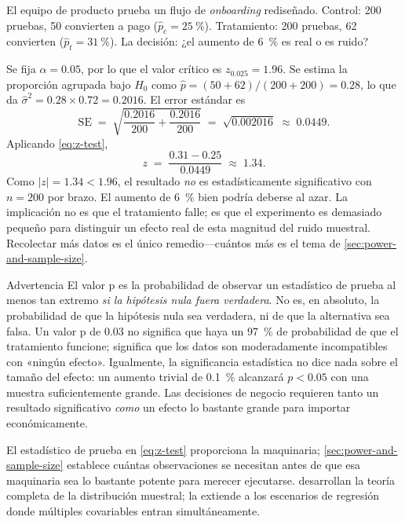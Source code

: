\begin{example}
El equipo de producto prueba un flujo de \emph{onboarding} rediseñado. Control: \num{200}
pruebas, \num{50} convierten a pago (\(\hat{p}_c = \qty{25}{\percent}\)). Tratamiento:
\num{200} pruebas, \num{62} convierten (\(\hat{p}_t = \qty{31}{\percent}\)). La decisión:
¿el aumento de \qty{6}{\percent} es real o es ruido?

Se fija \(\alpha=0.05\), por lo que el valor crítico es \(z_{0.025}=1.96\). Se estima la
proporción agrupada bajo \(H_0\) como \(\hat{p} = (50+62)/(200+200) = 0.28\), lo que da
\(\hat{\sigma}^2 = 0.28 \times 0.72 = 0.2016\). El error estándar es
\[
  \mathrm{SE} \;=\; \sqrt{\frac{0.2016}{200}+\frac{0.2016}{200}}
               \;=\; \sqrt{0.002016}
               \;\approx\; 0.0449.
\]
Aplicando \cref{eq:z-test},
\[
  z \;=\; \frac{0.31 - 0.25}{0.0449} \;\approx\; 1.34.
\]
Como \(|z|=1.34 < 1.96\), el resultado \emph{no} es estadísticamente significativo con
\(n=200\) por brazo. El aumento de \qty{6}{\percent} bien podría deberse al azar. La
implicación no es que el tratamiento falle; es que el experimento es demasiado pequeño para
distinguir un efecto real de esta magnitud del ruido muestral. Recolectar más datos es el
único remedio---cuántos más es el tema de \cref{sec:power-and-sample-size}.
\end{example}

\begin{admonition}{Advertencia}
El valor p es la probabilidad de observar un estadístico de prueba al menos tan extremo
\emph{si la hipótesis nula fuera verdadera}. No es, en absoluto, la probabilidad de que la
hipótesis nula sea verdadera, ni de que la alternativa sea falsa. Un valor p de \num{0.03}
no significa que haya un \qty{97}{\percent} de probabilidad de que el tratamiento funcione;
significa que los datos son moderadamente incompatibles con «ningún efecto». Igualmente, la
significancia estadística no dice nada sobre el tamaño del efecto: un aumento trivial de
\qty{0.1}{\percent} alcanzará \(p<0.05\) con una muestra suficientemente grande. Las
decisiones de negocio requieren tanto un resultado significativo \emph{como} un efecto lo
bastante grande para importar económicamente.
\end{admonition}

El estadístico de prueba en \cref{eq:z-test} proporciona la maquinaria; \cref{sec:power-and-sample-size}
establece cuántas observaciones se necesitan antes de que esa maquinaria sea lo bastante
potente para merecer ejecutarse. \textcite{anderson2019statistics} desarrollan la teoría
completa de la distribución muestral; \textcite{wooldridge2020introductory} la extiende a
los escenarios de regresión donde múltiples covariables entran simultáneamente.


